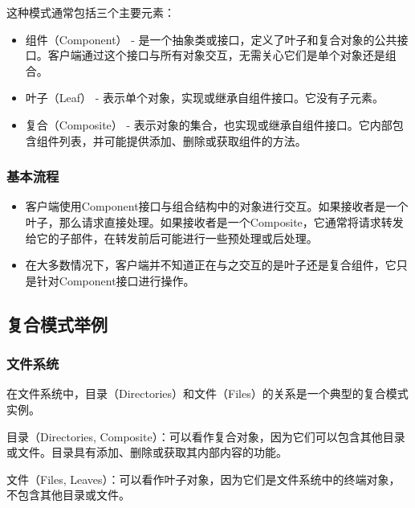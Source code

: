 这种模式通常包括三个主要元素：
\begin{itemize}
	\item 组件（Component） - 是一个抽象类或接口，定义了叶子和复合对象的公共接口。客户端通过这个接口与所有对象交互，无需关心它们是单个对象还是组合。
	\item 叶子（Leaf） - 表示单个对象，实现或继承自组件接口。它没有子元素。
	\item 复合（Composite） - 表示对象的集合，也实现或继承自组件接口。它内部包含组件列表，并可能提供添加、删除或获取组件的方法。
	
\end{itemize}

\subsubsection{基本流程}

\begin{itemize}
	\item 客户端使用Component接口与组合结构中的对象进行交互。如果接收者是一个叶子，那么请求直接处理。如果接收者是一个Composite，它通常将请求转发给它的子部件，在转发前后可能进行一些预处理或后处理。
	\item 在大多数情况下，客户端并不知道正在与之交互的是叶子还是复合组件，它只是针对Component接口进行操作。
\end{itemize}

\subsection{复合模式举例}

\subsubsection{文件系统}
在文件系统中，目录（Directories）和文件（Files）的关系是一个典型的复合模式实例。

目录（Directories, Composite）：可以看作复合对象，因为它们可以包含其他目录或文件。目录具有添加、删除或获取其内部内容的功能。

文件（Files, Leaves）：可以看作叶子对象，因为它们是文件系统中的终端对象，不包含其他目录或文件。

